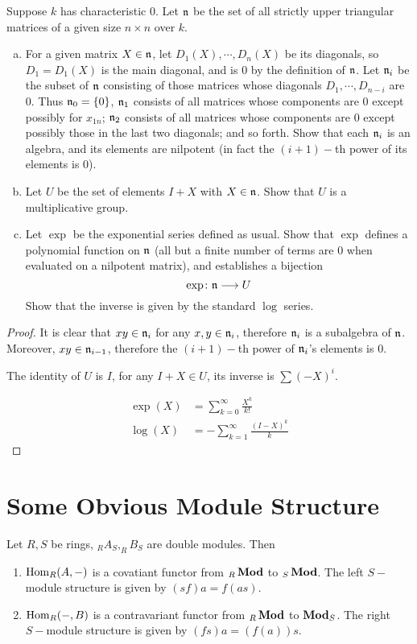   \begin{ex}
    Suppose $k$ has characteristic $0$. Let $\mathfrak{n}$ be the set of all strictly upper triangular matrices of a given size $n\times n$ over $k$.
    \begin{enumerate}[a)]
      \item For a given matrix $X\in\mathfrak{n}$, let $D_1(X),\cdots,D_n(X)$ be its diagonals, so $D_1=D_1(X)$ is the main diagonal, and is $0$ by the definition of $\mathfrak{n}$. Let $\mathfrak{n}_i$ be the subset of $\mathfrak{n}$ consisting of those matrices whose diagonals $D_1,\cdots,D_{n-i}$ are $0$. Thus $\mathfrak{n}_0=\{0\}$, $\mathfrak{n}_1$ consists of all matrices whose components are $0$ except possibly for $x_{1n}$; $\mathfrak{n}_2$ consists of all matrices whose components are $0$ except possibly those in the last two diagonals; and so forth. Show that each $\mathfrak{n}_i$ is an algebra, and its elements are nilpotent (in fact the $(i+1)-$th power of its elements is $0$).
      \item Let $U$ be the set of elements $I+X$ with $X\in\mathfrak{n}$. Show that $U$ is a multiplicative group.
      \item Let $\exp$ be the exponential series defined as usual. Show that $\exp$ defines a polynomial function on $\mathfrak{n}$ (all but a finite number of terms are $0$ when evaluated on a nilpotent matrix), and establishes a bijection
          \begin{equation*}
            \exp\colon\mathfrak{n}\longrightarrow U
          \end{equation*}
          Show that the inverse is given by the standard $\log$ series.
    \end{enumerate}
  \end{ex}
  \begin{proof}
    It is clear that $xy\in\mathfrak{n}_i$ for any $x,y\in\mathfrak{n}_i$, therefore $\mathfrak{n}_i$ is a subalgebra of $\mathfrak{n}$. Moreover, $xy\in\mathfrak{n}_{i-1}$, therefore the $(i+1)-$th power of $\mathfrak{n}_i$'s elements is $0$.

    The identity of $U$ is $I$, for any $I+X\in U$, its inverse is $\sum(-X)^i$.

    \begin{align*}
      \exp(X) & = \sum_{k=0}^{\infty} \frac{X^k}{k!} \\
      \log(X) & = - \sum_{k=1}^{\infty} \frac{(I-X)^k}{k}
    \end{align*}
  \end{proof}

\newpage\section{Some Obvious Module Structure}
\begin{prop}
  Let $R,S$ be rings, $ _RA_S, _RB_S$ are double modules. Then
  \begin{enumerate}
    \item $\operatorname{Hom}_R(A,-)$ is a covatiant functor from $ _R\operatorname{\mathbf{Mod}}$ to $ _S\operatorname{\mathbf{Mod}}$. The left $S-$module structure is given by $(sf)a=f(as)$.
    \item $\operatorname{Hom}_R(-,B)$ is a contravariant functor from $ _R\operatorname{\mathbf{Mod}}$ to $\operatorname{\mathbf{Mod}}_S$. The right $S-$module structure is given by $(fs)a=(f(a))s$.
  \end{enumerate}
\end{prop}

